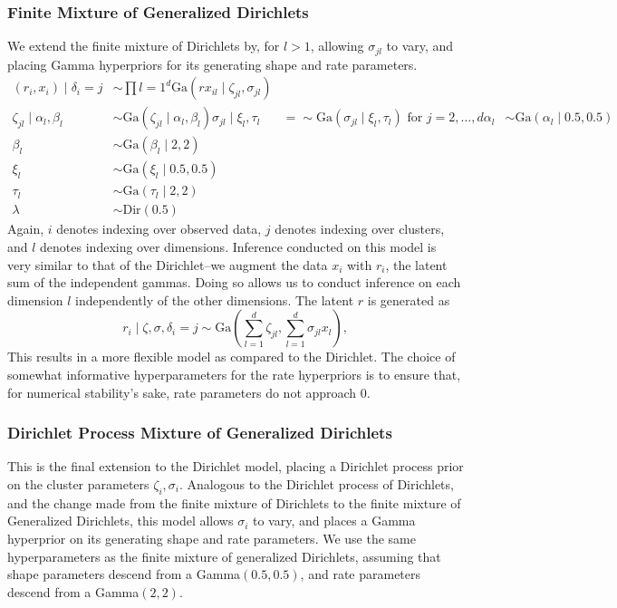 \subsubsection{Finite Mixture of Generalized Dirichlets}
We extend the finite mixture of Dirichlets by, for $l > 1$, allowing $\sigma_{jl}$ to vary, and
  placing Gamma hyperpriors for its generating shape and rate parameters.
  \begin{equation}
    \label{eq:fm_gendirichlet}
    \begin{aligned}
    (r_i, x_i) \mid \delta_i=j &\sim \prod{l = 1}^d\text{Ga}(rx_{il}\mid \zeta_{jl}, \sigma_{jl})\\
        \zeta_{jl} \mid \alpha_l,\beta_l &\sim \text{Ga}(\zeta_{jl}\mid \alpha_l, \beta_l)
        \sigma_{jl} \mid \xi_l, \tau_l &=\sim \text{Ga}(\sigma_{jl}\mid \xi_l, \tau_l)
                                                                  \text{ for }j = 2,\ldots,d
        \alpha_l &\sim \text{Ga}(\alpha_l \mid 0.5, 0.5)\\
        \beta_l &\sim \text{Ga}(\beta_l \mid 2, 2)\\
        \xi_l &\sim \text{Ga}(\xi_l\mid 0.5, 0.5)\\
        \tau_l &\sim \text{Ga}(\tau_l\mid 2, 2)\\
        \lambda &\sim \text{Dir}(0.5)
    \end{aligned}
  \end{equation}
Again, $i$ denotes indexing over observed data, $j$ denotes indexing over clusters, and $l$ denotes
  indexing over dimensions.  Inference conducted on this model is very similar to that of the
  Dirichlet--we augment the data $x_i$ with $r_i$, the latent sum of the independent gammas.
  Doing so allows us to conduct inference on each dimension $l$ independently of the other
  dimensions.  The latent $r$ is generated as
  \begin{equation}
    r_i\mid \zeta, \sigma, \delta_i=j \sim
        \text{Ga}\left(\sum_{l = 1}^d\zeta_{jl},\sum_{l=1}^d\sigma_{jl}x_l\right),
  \end{equation}
This results in a more flexible model as compared to the Dirichlet.  The choice of somewhat
  informative hyperparameters for the rate hyperpriors is to ensure that, for numerical stability's
  sake, rate parameters do not approach 0.

\subsubsection{Dirichlet Process Mixture of Generalized Dirichlets}
This is the final extension to the Dirichlet model, placing a Dirichlet process prior on the
  cluster parameters $\zeta_i,\sigma_i$.  Analogous to the Dirichlet process of Dirichlets, and
  the change made from the finite mixture of Dirichlets to the finite mixture of Generalized
  Dirichlets, this model allows $\sigma_i$ to vary, and places a Gamma hyperprior on its generating
  shape and rate parameters.  We use the same hyperparameters as the finite mixture of generalized
  Dirichlets, assuming that shape parameters descend from a Gamma$(0.5, 0.5)$, and rate parameters
  descend from a Gamma$(2,2)$.






